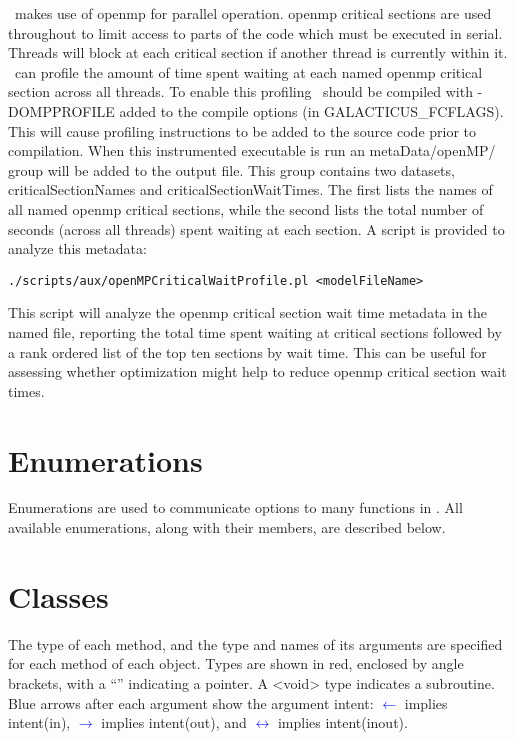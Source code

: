 \glc\ makes use of \gls{openmp} for parallel operation. \gls{openmp} {\normalfont \ttfamily critical} sections are used throughout to limit access to parts of the code which must be executed in serial. Threads will block at each {\normalfont \ttfamily critical} section if another thread is currently within it. \glc\ can profile the amount of time spent waiting at each named \gls{openmp} {\normalfont \ttfamily critical} section across all threads. To enable this profiling \glc\ should be compiled with {\normalfont \ttfamily -DOMPPROFILE} added to the compile options (in {\normalfont \ttfamily GALACTICUS\_FCFLAGS}). This will cause profiling instructions to be added to the source code prior to compilation. When this instrumented executable is run an {\normalfont \ttfamily metaData/openMP/} group will be added to the output file. This group contains two datasets, {\normalfont \ttfamily criticalSectionNames} and {\normalfont \ttfamily criticalSectionWaitTimes}. The first lists the names of all named \gls{openmp} {\normalfont \ttfamily critical} sections, while the second lists the total number of seconds (across all threads) spent waiting at each section. A script is provided to analyze this metadata:
\begin{verbatim}
./scripts/aux/openMPCriticalWaitProfile.pl <modelFileName>
\end{verbatim}
This script will analyze the \gls{openmp} {\normalfont \ttfamily critical} section wait time metadata in the named file, reporting the total time spent waiting at critical sections followed by a rank ordered list of the top ten sections by wait time. This can be useful for assessing whether optimization might help to reduce \gls{openmp} {\normalfont \ttfamily critical} section wait times.

\section{Enumerations}

Enumerations are used to communicate options to many functions in \glc. All available enumerations, along with their members, are described below.





\section{Classes}
 
The type of each method, and the type and names of its arguments are specified for each method of each object. Types are shown in red, enclosed by angle brackets, with a ``{\normalfont \ttfamily *}'' indicating a pointer. A {\normalfont \ttfamily \textless void\textgreater} type indicates a subroutine. Blue arrows after each argument show the argument intent: \textcolor{blue}{$\leftarrow$} implies {\normalfont \ttfamily intent(in)},  \textcolor{blue}{$\rightarrow$} implies {\normalfont \ttfamily intent(out)}, and \textcolor{blue}{$\leftrightarrow$} implies {\normalfont \ttfamily intent(inout)}.

